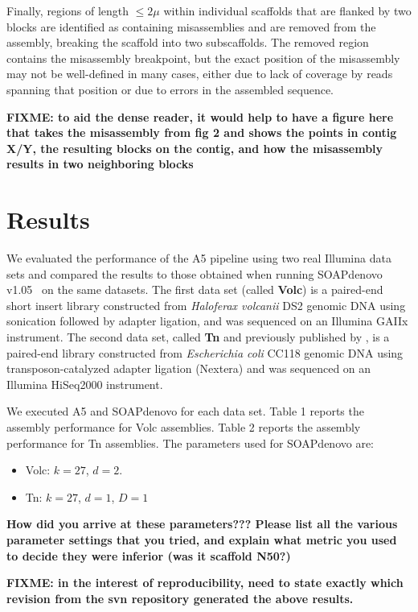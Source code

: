 \documentclass{bioinfo}
\begin{document}
Finally, regions of length $\le 2\mu$ within individual scaffolds that are flanked by two blocks are identified as containing
misassemblies and are removed from the assembly, breaking the scaffold into two subscaffolds. The removed region contains the 
misassembly breakpoint, but the exact position of the misassembly may not be well-defined in many cases, either due to lack of
coverage by reads spanning that position or due to errors in the assembled sequence.

\textbf{FIXME: to aid the dense reader, it would help to have a figure here that takes the misassembly from fig 2 and shows the points in contig X/Y, the resulting blocks on the contig, and how the misassembly results in two neighboring blocks}


\section{Results}

We evaluated the performance of the A5 pipeline using two real Illumina data sets and compared the results to
those obtained when running SOAPdenovo v1.05~\citep{Li2010} on the same datasets. The first data set (called \textbf{Volc}) is a paired-end short insert library constructed from \emph{Haloferax volcanii} DS2 genomic DNA 
using sonication followed by adapter ligation, and was sequenced on an Illumina GAIIx instrument. 
The second data set, called \textbf{Tn} and previously published by \citet{Adey2010}, is a paired-end library constructed from \emph{Escherichia coli} CC118 genomic DNA
using transposon-catalyzed adapter ligation (Nextera) and was sequenced on an Illumina HiSeq2000 instrument. 

We executed A5 and SOAPdenovo for each data set. Table 1 reports the assembly performance for Volc assemblies.
Table 2 reports the assembly performance for Tn assemblies. The parameters used for SOAPdenovo are:
\begin{itemize}
\item Volc: $k = 27$, $d = 2$.
\item Tn: $k = 27$, $d = 1$, $D = 1$
\end{itemize}

\textbf{How did you arrive at these parameters??? Please list all the various parameter settings that you tried, and explain what metric you
used to decide they were inferior (was it scaffold N50?)}

\textbf{FIXME: in the interest of reproducibility, need to state exactly which revision from the svn repository generated the above results.}
\end{document}
